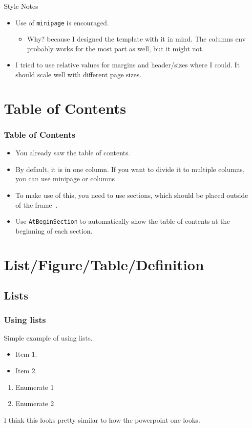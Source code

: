 \documentclass[
	10pt, %
	aspectratio=169, %
]{beamer}
\begin{document}
\begin{frame}{Style Notes}
	\begin{itemize}
		\item Use of \texttt{minipage} is encouraged.
		      \begin{itemize}
			      \item Why? because I designed the template with it in mind. The columns env probably works for the most part as well, but it might not.
		      \end{itemize}
		\item I tried to use relative values for margins and header/sizes where I could. It should scale well with different page sizes.
	\end{itemize}
\end{frame}


\section{Table of Contents}
\begin{frame}
	\frametitle{Table of Contents}
	\begin{itemize}
		\item You already saw the table of contents.
		\item By default, it is in one column. If you want to divide it to multiple columns, you can use minipage or columns~\cite{samcarter_is_at_topanswers.xyzAnswerBeamerVertical2013}
		\item To make use of this, you need to use sections, which should be placed outside of the frame~\cite{campaAnswerAtbeginsectionReturns2022}.
		\item Use \texttt{AtBeginSection} to automatically show the table of contents at the beginning of each section.
	\end{itemize}
\end{frame}


\section{List/Figure/Table/Definition}
\subsection{Lists}
\begin{frame}
	\frametitle{Using lists}
	Simple example of using lists.
	\begin{itemize}
		\item Item 1.
		\item Item 2.
	\end{itemize}

	\begin{enumerate}
		\setlength{\leftmargini}{12pt}
		\item Enumerate 1
		\item Enumerate 2
	\end{enumerate}
	I think this looks pretty similar to how the powerpoint one looks.
\end{frame}
\end{document}
